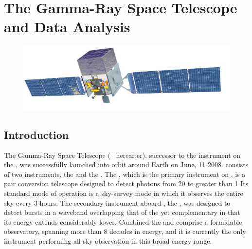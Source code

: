\chapter{The \Fermi{ }Gamma-Ray Space Telescope and \gam{} Data Analysis}
\label{chap:FGST}

\begin{figure}[ht!]
	\centering
	\includegraphics[width=1.0\columnwidth]{Figures/Fermi_telescope_illustration_01.jpg}
	\label{fig:fermi}
\end{figure}

\section{\label{FGST:intro}Introduction}
The \Fermi{} Gamma-Ray Space Telescope (\Fermi{} ~hereafter), successor to the \egret{} instrument on the \cgro{}, was successfully launched into orbit around Earth on June, 11 2008. \Fermi{} consists of two instruments, the \lat{} and the \gbm{}. The \lat{}, which is the primary instrument on \Fermi{}, is a pair conversion telescope designed to detect photons from 20\mev{} to greater than 1\tev{} \cite{atwood09, lat_perf, 2FHL} Its standard mode of operation is a sky-survey mode in which it observes the entire sky every 3 hours. The secondary instrument aboard \Fermi{}, the \gbm{}, was designed to detect \gam{} bursts in a waveband overlapping that of the \lat{} yet complementary in that its energy extends considerably lower. Combined the \lat{} and \gbm{} comprise a formidable observatory, spanning more than 8 decades in energy, and it is currently the only instrument performing all-sky observation in this broad energy range. 

